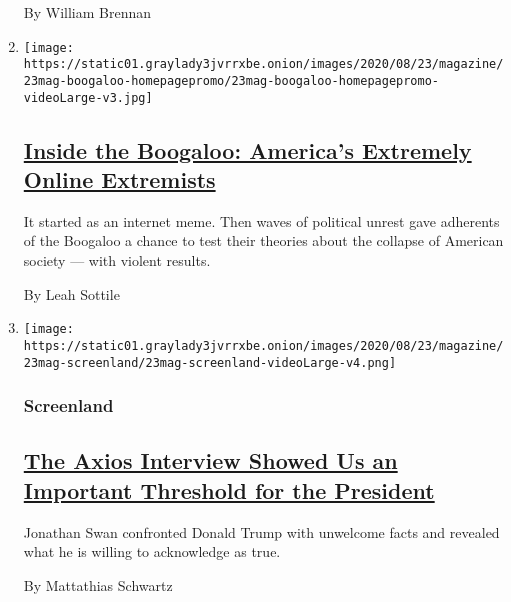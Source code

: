 \begin{enumerate}
  By William Brennan
\item
  \texttt{[image: https://static01.graylady3jvrrxbe.onion/images/2020/08/23/magazine/23mag-boogaloo-homepagepromo/23mag-boogaloo-homepagepromo-videoLarge-v3.jpg]}

  \hypertarget{inside-the-boogaloo-americas-extremely-online-extremists}{%
  \subsection{\texorpdfstring{\href{/interactive/2020/08/19/magazine/boogaloo.html}{Inside
  the Boogaloo: America's Extremely Online
  Extremists}}{Inside the Boogaloo: America's Extremely Online Extremists}}\label{inside-the-boogaloo-americas-extremely-online-extremists}}

  It started as an internet meme. Then waves of political unrest gave
  adherents of the Boogaloo a chance to test their theories about the
  collapse of American society --- with violent results.

  By Leah Sottile
\item
  \texttt{[image: https://static01.graylady3jvrrxbe.onion/images/2020/08/23/magazine/23mag-screenland/23mag-screenland-videoLarge-v4.png]}

  \hypertarget{screenland}{%
  \subsubsection{Screenland}\label{screenland}}

  \hypertarget{the-axios-interview-showed-us-an-important-threshold-for-the-president}{%
  \subsection{\texorpdfstring{\href{/2020/08/19/magazine/trump-axios-interview.html}{The
  Axios Interview Showed Us an Important Threshold for the
  President}}{The Axios Interview Showed Us an Important Threshold for the President}}\label{the-axios-interview-showed-us-an-important-threshold-for-the-president}}

  Jonathan Swan confronted Donald Trump with unwelcome facts and
  revealed what he is willing to acknowledge as true.

  By Mattathias Schwartz
\end{enumerate}

